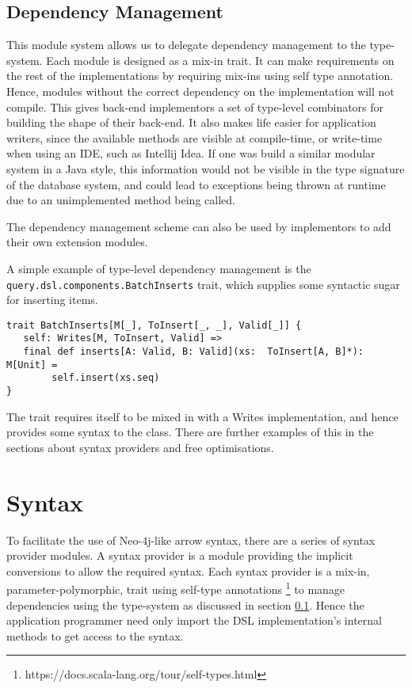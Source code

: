 \documentclass{report}
\newcommand \2[0]{\textbf{2}}
\newcommand \3[0]{\textbf{3}}
\begin{document}
\subsection{Dependency Management}\label{depManagement}
This module system allows us to delegate dependency management to the type-system. Each module is designed as a mix-in trait. It can make requirements on the rest of the implementations by requiring mix-ins using self type annotation. Hence, modules without the correct dependency on the implementation will not compile. This gives back-end implementors a set of type-level combinators for building the shape of their back-end. It also makes life easier for application writers, since the available methods are visible at compile-time, or write-time when using an IDE, such as Intellij Idea. If one was build a similar modular system in a Java style, this information would not be visible in the type signature of the database system, and could lead to exceptions being thrown at runtime due to an unimplemented method being called.

The dependency management scheme can also be used by implementors to add their own extension modules.

A simple example of type-level dependency management is the \texttt{query.dsl.components.BatchInserts} trait, which supplies some syntactic sugar for inserting items.

\begin{verbatim}
trait BatchInserts[M[_], ToInsert[_, _], Valid[_]] {
   self: Writes[M, ToInsert, Valid] =>
   final def inserts[A: Valid, B: Valid](xs:  ToInsert[A, B]*): M[Unit] =
        self.insert(xs.seq)
}
\end{verbatim}


The trait requires itself to be mixed in with a Writes implementation, and hence provides some syntax to the class. There are further examples of this in the sections about syntax providers and free optimisations.

\section{Syntax}
To facilitate the use of Neo-4j-like arrow syntax, there are a series of syntax provider modules. A syntax provider is a module providing the implicit conversions to allow the required syntax. Each syntax provider is a mix-in, parameter-polymorphic, trait using self-type annotations \footnote{https://docs.scala-lang.org/tour/self-types.html} to manage dependencies using the type-system as discussed in section \ref{depManagement}. Hence the application programmer need only import the DSL implementation's internal methods to get access to the syntax.
\end{document}
